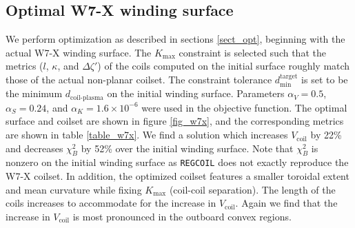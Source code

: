 \documentclass[aps,unsortedaddress]{revtex4-1}
\begin{document}
\subsection{Optimal W7-X winding surface}
\FloatBarrier
We perform optimization as described in sections \ref{sect_opt}, beginning with the actual W7-X winding surface. The $K_{\text{max}}$ constraint is selected such that the metrics ($l$, $\kappa$, and $\Delta \zeta'$) of the coils computed on the initial surface roughly match those of the actual non-planar coilset. The constraint tolerance $d_{\text{min}}^{\text{target}}$ is set to be the minimum $d_{\text{coil-plasma}}$ on the initial winding surface. Parameters $\alpha_V = 0.5$, $\alpha_S = 0.24$, and $\alpha_K = 1.6\times10^{-6}$ were used in the objective function. The optimal surface and coilset are shown in figure \ref{fig_w7x}, and the corresponding metrics are shown in table \ref{table_w7x}. We find a solution which increases $V_{\text{coil}}$ by 22\% and decreases $\chi^2_B$ by 52\% over the initial winding surface. Note that $\chi^2_B$ is nonzero on the initial winding surface as \texttt{REGCOIL} does not exactly reproduce the W7-X coilset. In addition, the optimized coilset features a smaller toroidal extent and mean curvature while fixing $K_{\text{max}}$ (coil-coil separation). The length of the coils increases to accommodate for the increase in $V_{\text{coil}}$. Again we find that the increase in $V_{\text{coil}}$ is most pronounced in the outboard convex regions. 
\end{document}
